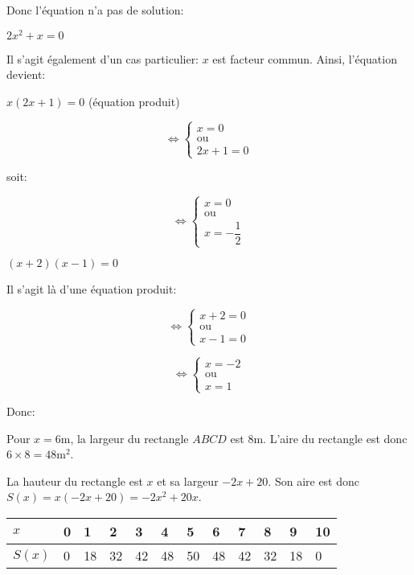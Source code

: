 \documentclass[a4paper,12pt]{scrartcl}
\begin{document}
Donc l'équation n'a pas de solution: 



\question{}
$2x^2 + x = 0$

Il s'agit également d'un cas particulier: $x$ est facteur commun. Ainsi, l'équation devient: 

$x(2x+1) = 0$ (équation produit)

\[ \Leftrightarrow
  \begin{cases}
   x      = 0 \\
   \text{ou} \\
   2x + 1 = 0 
  \end{cases}
\]

soit:

\[ \Leftrightarrow
  \begin{cases}
   x = 0 \\
   \text{ou} \\
   x = -\dfrac{1}{2} 
  \end{cases}
\]



\question{}
$(x+2)(x-1) = 0$

Il s'agit là d'une équation produit: 

\[ \Leftrightarrow
  \begin{cases}
   x+2 = 0 \\
   \text{ou} \\
   x-1 = 0
  \end{cases}
\]

\[ \Leftrightarrow
  \begin{cases}
    x = -2 \\
   \text{ou} \\
    x = 1 
  \end{cases}
\]

Donc:


\exo{}

\question{}
Pour $x = 6$m, la largeur du rectangle $ABCD$ est 8m. L'aire du rectangle est donc $6 \times 8 = 48 \mbox{m}^2$.

\question{}
La hauteur du rectangle est $x$ et sa largeur $-2x + 20$. Son aire est donc $S(x) = x(-2x + 20) = -2x^2 + 20x$.

\question{}
\begin{table}[h]
\begin{center}
\begin{tabular}{|l|l|l|l|l|l|l|l|l|l|l|l|}
\hline
$x$    & 0 & 1  & 2  & 3  & 4  & 5  & 6  & 7  & 8  & 9  & 10 \\ \hline
$S(x)$ & 0 & 18 & 32 & 42 & 48 & 50 & 48 & 42 & 32 & 18 & 0  \\ \hline
\end{tabular}
\end{center}
\end{table}
\end{document}
